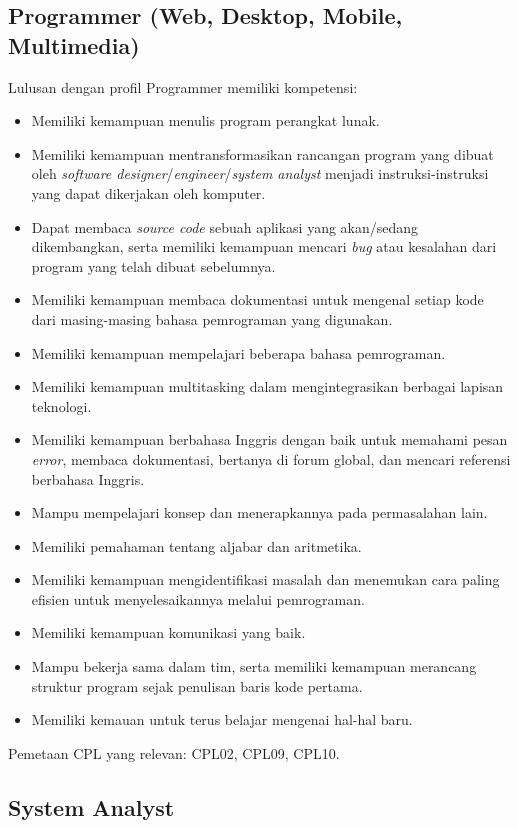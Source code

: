 \subsection{Programmer (Web, Desktop, Mobile, Multimedia)}

Lulusan dengan profil Programmer memiliki kompetensi:
\begin{itemize}
\item Memiliki kemampuan menulis program perangkat lunak.
\item Memiliki kemampuan mentransformasikan rancangan program yang dibuat oleh \textit{software designer}/\textit{engineer}/\textit{system analyst} menjadi instruksi-instruksi yang dapat dikerjakan oleh komputer.
\item Dapat membaca \textit{source code} sebuah aplikasi yang akan/sedang dikembangkan, serta memiliki kemampuan mencari \textit{bug} atau kesalahan dari program yang telah dibuat sebelumnya.
\item Memiliki kemampuan membaca dokumentasi untuk mengenal setiap kode dari masing-masing bahasa pemrograman yang digunakan.
\item Memiliki kemampuan mempelajari beberapa bahasa pemrograman.
\item Memiliki kemampuan multitasking dalam mengintegrasikan berbagai lapisan teknologi.
\item Memiliki kemampuan berbahasa Inggris dengan baik untuk memahami pesan \textit{error}, membaca dokumentasi, bertanya di forum global, dan mencari referensi berbahasa Inggris.
\item Mampu mempelajari konsep dan menerapkannya pada permasalahan lain.
\item Memiliki pemahaman tentang aljabar dan aritmetika.
\item Memiliki kemampuan mengidentifikasi masalah dan menemukan cara paling efisien untuk menyelesaikannya melalui pemrograman.
\item Memiliki kemampuan komunikasi yang baik.
\item Mampu bekerja sama dalam tim, serta memiliki kemampuan merancang struktur program sejak penulisan baris kode pertama.
\item Memiliki kemauan untuk terus belajar mengenai hal-hal baru.
\end{itemize}
Pemetaan CPL yang relevan: CPL02, CPL09, CPL10.

\subsection{System Analyst}

